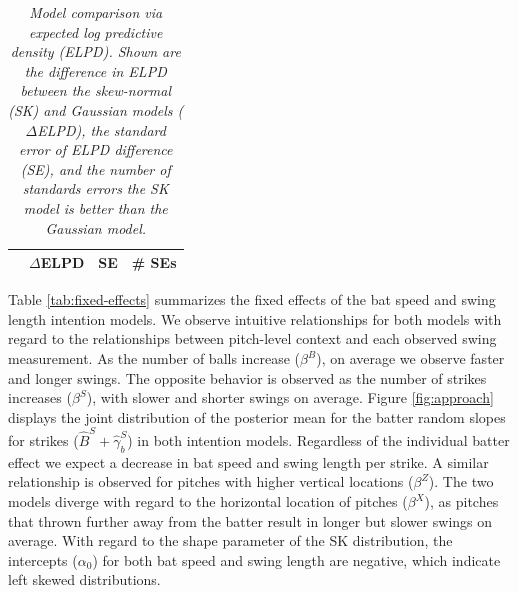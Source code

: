 \documentclass{article}
\begin{document}
      \begin{table}[H]
        \centering
        \begin{tabular}{l|r|r|r|}
          & $\Delta$ELPD  & SE & \# SEs \\
          \hline
          
        \end{tabular}
        \caption{\it Model comparison via expected log predictive density (ELPD). Shown are the difference in ELPD between the skew-normal (SK) and Gaussian models ($\Delta$ELPD), the standard error of ELPD difference (SE), and the number of standards errors the SK model is better than the Gaussian model.}
        \label{tab:intention-model-elpd}
      \end{table}

       Table \ref{tab:fixed-effects} summarizes the fixed effects of the bat speed and swing length intention models. We observe intuitive relationships for both models with regard to the relationships between pitch-level context and each observed swing measurement. As the number of balls increase ($\beta^B$), on average we observe faster and longer swings. The opposite behavior is observed as the number of strikes increases ($\beta^S$), with slower and shorter swings on average. Figure \ref{fig:approach} displays the joint distribution of the posterior mean for the batter random slopes for strikes ($\hat{B}^S + \hat{\gamma}_b^S$) in both intention models. Regardless of the individual batter effect we expect a decrease in bat speed and swing length per strike. A similar relationship is observed for pitches with higher vertical locations ($\beta^Z$). The two models diverge with regard to the horizontal location of pitches ($\beta^X$), as pitches that thrown further away from the batter result in longer but slower swings on average. With regard to the shape parameter of the SK distribution, the intercepts ($\alpha_0$) for both bat speed and swing length are negative, which indicate left skewed distributions.
\end{document}
